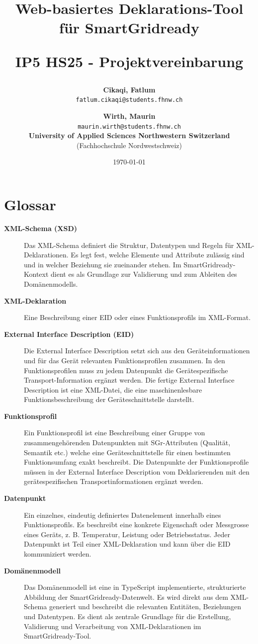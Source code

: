 \documentclass[a4paper,12pt]{article}
\title{
  \textbf{Web-basiertes Deklarations-Tool für SmartGridready} \\[1ex]
  \begin{large}
    \textbf{IP5 HS25 - Projektvereinbarung} \\
  \end{large}
}
\author{
  \textbf{Cikaqi, Fatlum} \\
  \texttt{fatlum.cikaqi@students.fhnw.ch}
  \and
  \textbf{Wirth, Maurin} \\
  \texttt{maurin.wirth@students.fhnw.ch} \\[2em]
  \textbf{University of Applied Sciences Northwestern Switzerland} \\
  (Fachhochschule Nordwestschweiz)
}
\date{\today}
\begin{document}
\maketitle

\newpage

\section*{Glossar}
\begin{description}
  \item[\textbf{XML-Schema (XSD)}]
    Das XML-Schema definiert die Struktur, Datentypen und Regeln für XML-Deklarationen. Es legt fest, welche Elemente und Attribute zulässig sind und in welcher Beziehung sie zueinander stehen. Im SmartGridready-Kontext dient es als Grundlage zur Validierung und zum Ableiten des Domänenmodells.

  \item[\textbf{XML-Deklaration}]
    Eine Beschreibung einer EID oder eines Funktionsprofils im XML-Format.

  \item[\textbf{External Interface Description (EID)}]
    Die External Interface Description setzt sich aus den Geräteinformationen und für das Gerät relevanten Funktionsprofilen zusammen. In den Funktionsprofilen muss zu jedem Datenpunkt die Gerätespezifische Transport-Information ergänzt werden. Die fertige External Interface Description ist eine XML-Datei, die eine maschinenlesbare Funktionsbeschreibung der Geräteschnittstelle darstellt.

  \item[\textbf{Funktionsprofil}]
    Ein Funktionsprofil ist eine Beschreibung einer Gruppe von zusammengehörenden Datenpunkten mit SGr-Attributen (Qualität, Semantik etc.) welche eine Geräteschnittstelle für einen bestimmten Funktionsumfang exakt beschreibt. Die Datenpunkte der Funktionsprofile müssen in der External Interface Description vom Deklarierenden mit den gerätespezifischen Transportinformationen ergänzt werden.

  \item[\textbf{Datenpunkt}]
    Ein einzelnes, eindeutig definiertes Datenelement innerhalb eines Funktionsprofils. Es beschreibt eine konkrete Eigenschaft oder Messgrosse eines Geräts, z. B. Temperatur, Leistung oder Betriebsstatus. Jeder Datenpunkt ist Teil einer XML-Deklaration und kann über die EID kommuniziert werden.

  \item[\textbf{Domänenmodell}]
    Das Domänenmodell ist eine in TypeScript implementierte, strukturierte Abbildung der SmartGridready-Datenwelt. Es wird direkt aus dem XML-Schema generiert und beschreibt die relevanten Entitäten, Beziehungen und Datentypen. Es dient als zentrale Grundlage für die Erstellung, Validierung und Verarbeitung von XML-Deklarationen im SmartGridready-Tool.
\end{description}
\end{document}
